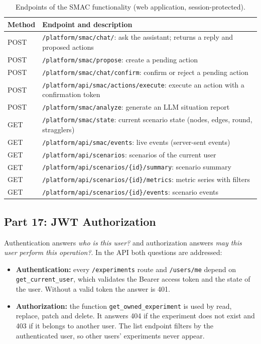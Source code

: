 \documentclass[9pt,a4paper,twocolumn]{article}
\begin{document}
\begin{table}[H]
\centering
\scriptsize
\begin{tabularx}{\columnwidth}{l >{\raggedright\arraybackslash}X}
\hline
\textbf{Method} & \textbf{Endpoint and description} \\
\hline
POST & \texttt{/platform/smac/chat/}: ask the assistant; returns a reply and proposed actions \\
POST & \texttt{/platform/smac/propose}: create a pending action \\
POST & \texttt{/platform/smac/chat/confirm}: confirm or reject a pending action \\
POST & \texttt{/platform/api/smac/actions/execute}: execute an action with a confirmation token \\
POST & \texttt{/platform/smac/analyze}: generate an LLM situation report \\
GET & \texttt{/platform/smac/state}: current scenario state (nodes, edges, round, stragglers) \\
GET & \texttt{/platform/api/smac/events}: live events (server-sent events) \\
GET & \texttt{/platform/api/scenarios}: scenarios of the current user \\
GET & \texttt{/platform/api/scenarios/\{id\}/summary}: scenario summary \\
GET & \texttt{/platform/api/scenarios/\{id\}/metrics}: metric series with filters \\
GET & \texttt{/platform/api/scenarios/\{id\}/events}: scenario events \\
\hline
\end{tabularx}
\caption{Endpoints of the SMAC functionality (web application, session-protected).}
\label{tab:smac-endpoints}
\end{table}

\subsection{Part 17: JWT Authorization}

Authentication answers \textit{who is this user?} and authorization answers \textit{may this user perform this operation?}. In the API both questions are addressed:

\begin{itemize}
    \item \textbf{Authentication:} every \texttt{/experiments} route and \texttt{/users/me} depend on \texttt{get\_current\_user}, which validates the Bearer access token and the state of the user. Without a valid token the answer is 401.
    \item \textbf{Authorization:} the function \texttt{get\_owned\_experiment} is used by read, replace, patch and delete. It answers 404 if the experiment does not exist and 403 if it belongs to another user. The list endpoint filters by the authenticated user, so other users' experiments never appear.
\end{itemize}
\end{document}
